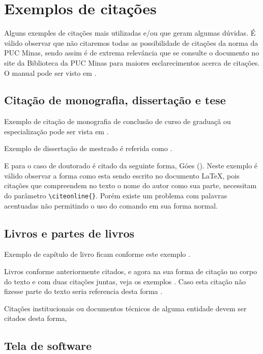\section{\hspace{-0.3cm}Exemplos de citações} 

Alguns exemples de citações mais utilizadas e/ou que geram algumas dúvidas. É válido observar que não citaremos
todas as possibilidade de citações da norma da PUC Minas, sendo assim é de extrema relevância que se consulte 
o documento no site da Biblioteca da PUC Minas para maiores esclarecimentos acerca de citações. O manual pode
ser visto em .

\subsection{\hspace{-0.3cm}Citação de monografia, dissertação e tese}

Exemplo de citação de monografia de conclusão de curso de graduaçã ou especialização pode ser vista em .

Exemplo de dissertação de mestrado é referida como .

E para o caso de doutorado é citado da seguinte forma, Góes (\citeyear{tese}). Neste exemplo é válido observar a forma
como esta sendo escrito no documento \LaTeX, pois citações que compreendem no texto o nome do autor como sua parte, necessitam 
do parâmetro \verb$\citeonline{}$. Porém existe um problema com palavras acentuadas não permitindo o uso do comando em sua forma normal.

\subsection{\hspace{-0.3cm}Livros e partes de livros}

Exemplo de capítulo de livro ficam conforme este exemplo \cite{cap-livro}.

Livros conforme anteriormente citados, e agora na sua forma de citação no corpo do texto e com duas citações juntas, veja os exemplos .
Caso esta citação não fizesse parte do texto seria referencia desta forma \cite{knuth,groupp}.

Citações institucionais ou documentos técnicos de alguma entidade devem ser citados desta forma, \cite{pmbok}

\subsection{\hspace{-0.3cm}Tela de software}

